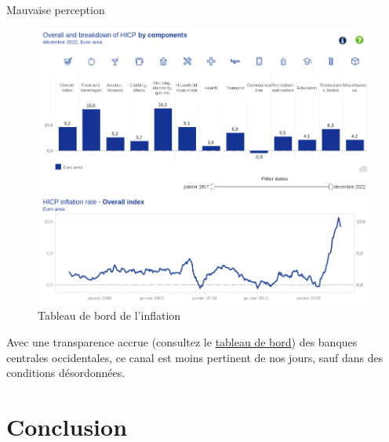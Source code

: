 \documentclass[
  ignorenonframetext,
  aspectratio=169,
]{beamer}
\begin{document}
\begin{frame}{Mauvaise perception}
\label{mauvaise-perception-3}
\begin{figure}[H]

{\centering \includegraphics[width=\textwidth,height=0.6\textheight]{assets/inflation_dashboard.png}

}

\caption{Tableau de bord de l'inflation}

\end{figure}%

Avec une transparence accrue (consultez le
\href{https://www.ecb.europa.eu/stats/macroeconomic_and_sectoral/hicp/html/index.en.html}{tableau
de bord}) des banques centrales occidentales, ce canal est moins
pertinent de nos jours, sauf dans des conditions désordonnées.
\end{frame}

\section{Conclusion}\label{conclusion}
\end{document}
